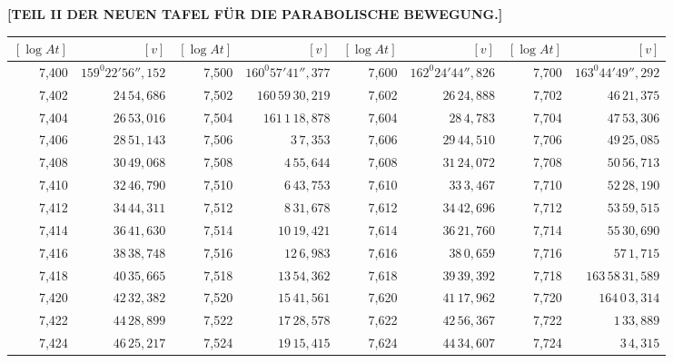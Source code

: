 \clearpage
{}
\begingroup
\centering
\fontsize{9}{9}\selectfont
\setlength{\tabcolsep}{.2pt}
\renewcommand{\arraystretch}{.9}
\setlength{\parskip}{0pt}
\textbf{[TEIL II DER NEUEN TAFEL FÜR DIE PARABOLISCHE BEWEGUNG.]}
\par\vspace{7pt}
\begin{tabular}{|r|r||r|r||r|r||r|r|}
\hline
\([\log At]\) & \([v]\) & \([\log At]\) & \([v]\) & \([\log At]\) & \([v]\) & \([\log At]\) & \([v]\) \\
\hline
7,400 & \(159^{0}22'56'',\!152\) & 7,500 & \(160^{0}57'41'',\!377\) & 7,600 & \(162^{0}24'44'',\!826\) & 7,700 & \(163^{0}44'49'',\!292\) \\[1pt]
7,402 & \(24\,54,\!686\) & 7,502 & \(160\,59\,30,\!219\) & 7,602 & \(26\,24,\!888\) & 7,702 & \(46\,21,\!375\) \\
7,404 & \(26\,53,\!016\) & 7,504 & \(161\,1\,18,\!878\) & 7,604 & \(28\,4,\!783\) & 7,704 & \(47\,53,\!306\) \\
7,406 & \(28\,51,\!143\) & 7,506 & \(3\,7,\!353\) & 7,606 & \(29\,44,\!510\) & 7,706 & \(49\,25,\!085\) \\
7,408 & \(30\,49,\!068\) & 7,508 & \(4\,55,\!644\) & 7,608 & \(31\,24,\!072\) & 7,708 & \(50\,56,\!713\) \\
7,410 & \(32\,46,\!790\) & 7,510 & \(6\,43,\!753\) & 7,610 & \(33\,3,\!467\) & 7,710 & \(52\,28,\!190\) \\[1pt]
7,412 & \(34\,44,\!311\) & 7,512 & \(8\,31,\!678\) & 7,612 & \(34\,42,\!696\) & 7,712 & \(53\,59,\!515\) \\
7,414 & \(36\,41,\!630\) & 7,514 & \(10\,19,\!421\) & 7,614 & \(36\,21,\!760\) & 7,714 & \(55\,30,\!690\) \\
7,416 & \(38\,38,\!748\) & 7,516 & \(12\,6,\!983\) & 7,616 & \(38\,0,\!659\) & 7,716 & \(57\,1,\!715\) \\
7,418 & \(40\,35,\!665\) & 7,518 & \(13\,54,\!362\) & 7,618 & \(39\,39,\!392\) & 7,718 & \(163\,58\,31,\!589\) \\
7,420 & \(42\,32,\!382\) & 7,520 & \(15\,41,\!561\) & 7,620 & \(41\,17,\!962\) & 7,720 & \(164\,0\,3,\!314\) \\[1pt]
7,422 & \(44\,28,\!899\) & 7,522 & \(17\,28,\!578\) & 7,622 & \(42\,56,\!367\) & 7,722 & \(1\,33,\!889\) \\
7,424 & \(46\,25,\!217\) & 7,524 & \(19\,15,\!415\) & 7,624 & \(44\,34,\!607\) & 7,724 & \(3\,4,\!315\) \\

\end{tabular}
